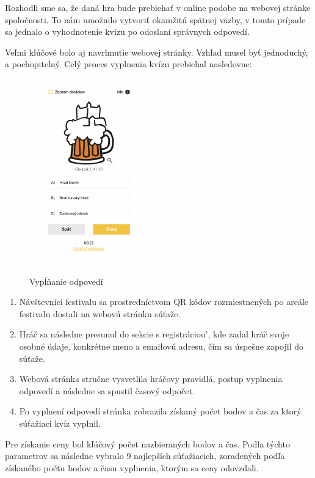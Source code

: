 \documentclass[10pt,twoside,slovak,a4paper]{article}
\begin{document}
Rozhodli sme sa, že daná hra bude prebiehať v online podobe na webovej stránke spoločnosti. To nám umožnilo vytvoriť okamžitú spätnej väzby, v tomto prípade sa jednalo o vyhodnotenie kvízu po odoslaní správnych odpovedí. 

Veľmi klúčové bolo aj navrhnutie webovej stránky. Vzhľad musel byť jednoduchý, a pochopitelný. Celý proces vyplnenia kvízu prebiehal nasledovne:

\begin{figure}[tbh]
	\centering
	\includegraphics[scale=2.0]{obrazok2.pdf}

\caption{Vypĺňanie odpovedí}

\end{figure}
\begin{enumerate}
	\item Návštevníci festivalu sa prostredníctvom QR kódov rozmiestnených po areále festivalu dostali na webovú stránku súťaže.
	\item Hráč sa následne presunul do sekcie s registráciou', kde zadal hráč svoje osobné údaje, konkrétne meno a emailovú adresu, čím sa úspešne zapojil do súťaže.
	\item Webová stránka stručne vysvetlila hráčovy pravidlá, postup vyplnenia odpovedí a následne sa spustil časový odpočet.
	\item Po vyplnení odpovedí stránka zobrazila získaný počet bodov a čas za ktorý súťažiaci kvíz vyplnil.
\end{enumerate}



Pre získanie ceny bol kľúčový počet nazbieraných bodov a čas. Podla týchto parametrov sa následne vybralo 9 najlepších súťažiacich, zoradených podľa získaného počtu bodov a času vyplnenia, ktorým sa ceny odovzdali.
\end{document}
